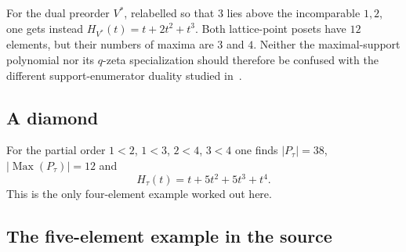 \documentclass[11pt]{article}
\numberwithin{equation}{section}
\theoremstyle{definition}
\theoremstyle{remark}
\newcommand{\Max}{\operatorname{Max}}
\begin{document}
For the dual preorder $V^*$, relabelled so that $3$ lies above the
incomparable $1,2$, one gets instead $H_{V^*}(t)=t+2t^2+t^3$. Both
lattice-point posets have $12$ elements, but their numbers of maxima are $3$
and $4$. Neither the maximal-support polynomial nor its $q$-zeta
specialization should therefore be confused with the different
support-enumerator duality studied in~\cite{DaiEtAl}.

\subsection{A diamond}

For the partial order $1<2$, $1<3$, $2<4$, $3<4$ one finds $|P_\tau|=38$,
$|\Max(P_\tau)|=12$ and
\[
 H_\tau(t)=t+5t^2+5t^3+t^4 .
\]
This is the only four-element example worked out here.

\subsection{The five-element example in the source}
\end{document}
